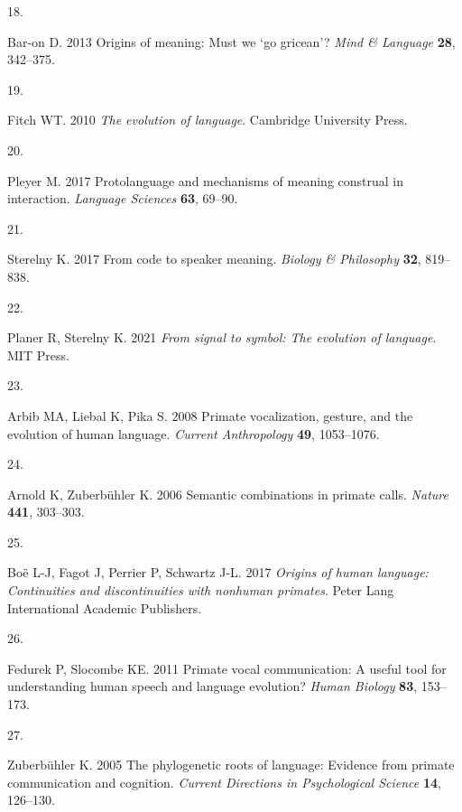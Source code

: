 \documentclass[
  man,floatsintext]{apa6}
\newlength{\cslhangindent}
\newlength{\csllabelwidth}
\newlength{\cslentryspacingunit} %
\newenvironment{CSLReferences}[2] %
 {%
  \setlength{\parindent}{0pt}
  \ifodd #1
  \let\oldpar\par
  \def\par{\hangindent=\cslhangindent\oldpar}
  \fi
  \setlength{\parskip}{#2\cslentryspacingunit}
 }%
 {}
\newcommand{\CSLLeftMargin}[1]{\parbox[t]{\csllabelwidth}{#1}}
\newcommand{\CSLRightInline}[1]{\parbox[t]{\linewidth - \csllabelwidth}{#1}\break}
\begin{document}
\begin{CSLReferences}{0}{0}
\leavevmode{}%
\CSLLeftMargin{18. }
\CSLRightInline{Bar-on D. 2013 Origins of meaning: Must we {`go gricean'}? \emph{Mind \& Language} \textbf{28}, 342--375.}

\leavevmode{}%
\CSLLeftMargin{19. }
\CSLRightInline{Fitch WT. 2010 \emph{The evolution of language}. Cambridge University Press. }

\leavevmode{}%
\CSLLeftMargin{20. }
\CSLRightInline{Pleyer M. 2017 Protolanguage and mechanisms of meaning construal in interaction. \emph{Language Sciences} \textbf{63}, 69--90.}

\leavevmode{}%
\CSLLeftMargin{21. }
\CSLRightInline{Sterelny K. 2017 From code to speaker meaning. \emph{Biology \& Philosophy} \textbf{32}, 819--838.}

\leavevmode{}%
\CSLLeftMargin{22. }
\CSLRightInline{Planer R, Sterelny K. 2021 \emph{From signal to symbol: The evolution of language}. MIT Press. }

\leavevmode{}%
\CSLLeftMargin{23. }
\CSLRightInline{Arbib MA, Liebal K, Pika S. 2008 Primate vocalization, gesture, and the evolution of human language. \emph{Current Anthropology} \textbf{49}, 1053--1076.}

\leavevmode{}%
\CSLLeftMargin{24. }
\CSLRightInline{Arnold K, Zuberbühler K. 2006 Semantic combinations in primate calls. \emph{Nature} \textbf{441}, 303--303.}

\leavevmode{}%
\CSLLeftMargin{25. }
\CSLRightInline{Boë L-J, Fagot J, Perrier P, Schwartz J-L. 2017 \emph{Origins of human language: Continuities and discontinuities with nonhuman primates}. Peter Lang International Academic Publishers. }

\leavevmode{}%
\CSLLeftMargin{26. }
\CSLRightInline{Fedurek P, Slocombe KE. 2011 Primate vocal communication: A useful tool for understanding human speech and language evolution? \emph{Human Biology} \textbf{83}, 153--173.}

\leavevmode{}%
\CSLLeftMargin{27. }
\CSLRightInline{Zuberbühler K. 2005 The phylogenetic roots of language: Evidence from primate communication and cognition. \emph{Current Directions in Psychological Science} \textbf{14}, 126--130.}


\end{CSLReferences}
\end{document}
